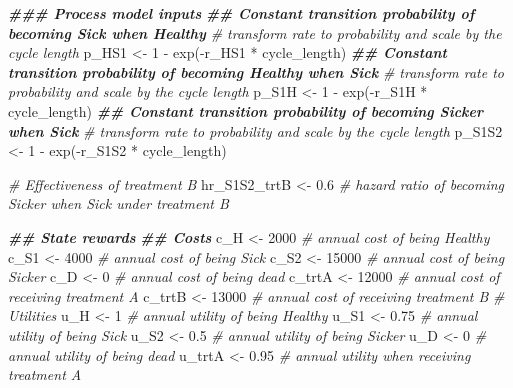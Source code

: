 \documentclass[
]{article}
\newenvironment{Shaded}{\begin{snugshade}}{\end{snugshade}}
\newcommand{\CommentTok}[1]{\textcolor[rgb]{0.56,0.35,0.01}{\textit{#1}}}
\newcommand{\DecValTok}[1]{\textcolor[rgb]{0.00,0.00,0.81}{#1}}
\newcommand{\DocumentationTok}[1]{\textcolor[rgb]{0.56,0.35,0.01}{\textbf{\textit{#1}}}}
\newcommand{\FloatTok}[1]{\textcolor[rgb]{0.00,0.00,0.81}{#1}}
\newcommand{\FunctionTok}[1]{\textcolor[rgb]{0.00,0.00,0.00}{#1}}
\newcommand{\NormalTok}[1]{#1}
\newcommand{\OtherTok}[1]{\textcolor[rgb]{0.56,0.35,0.01}{#1}}
\newcommand{\SpecialCharTok}[1]{\textcolor[rgb]{0.00,0.00,0.00}{#1}}
\begin{document}
\begin{Shaded}
\begin{Highlighting}[]
\DocumentationTok{\#\#\# Process model inputs}
\DocumentationTok{\#\# Constant transition probability of becoming Sick when Healthy}
\CommentTok{\# transform rate to probability and scale by the cycle length}
\NormalTok{p\_HS1 }\OtherTok{\textless{}{-}} \DecValTok{1} \SpecialCharTok{{-}} \FunctionTok{exp}\NormalTok{(}\SpecialCharTok{{-}}\NormalTok{r\_HS1 }\SpecialCharTok{*}\NormalTok{ cycle\_length)}
\DocumentationTok{\#\# Constant transition probability of becoming Healthy when Sick}
\CommentTok{\# transform rate to probability and scale by the cycle length}
\NormalTok{p\_S1H }\OtherTok{\textless{}{-}} \DecValTok{1} \SpecialCharTok{{-}} \FunctionTok{exp}\NormalTok{(}\SpecialCharTok{{-}}\NormalTok{r\_S1H }\SpecialCharTok{*}\NormalTok{ cycle\_length)}
\DocumentationTok{\#\# Constant transition probability of becoming Sicker when Sick}
\CommentTok{\# transform rate to probability and scale by the cycle length}
\NormalTok{p\_S1S2 }\OtherTok{\textless{}{-}} \DecValTok{1} \SpecialCharTok{{-}} \FunctionTok{exp}\NormalTok{(}\SpecialCharTok{{-}}\NormalTok{r\_S1S2 }\SpecialCharTok{*}\NormalTok{ cycle\_length)}

\CommentTok{\# Effectiveness of treatment B}
\NormalTok{hr\_S1S2\_trtB }\OtherTok{\textless{}{-}} \FloatTok{0.6} \CommentTok{\# hazard ratio of becoming Sicker when Sick under treatment B}

\DocumentationTok{\#\# State rewards}
\DocumentationTok{\#\# Costs}
\NormalTok{c\_H    }\OtherTok{\textless{}{-}} \DecValTok{2000}  \CommentTok{\# annual cost of being Healthy}
\NormalTok{c\_S1   }\OtherTok{\textless{}{-}} \DecValTok{4000}  \CommentTok{\# annual cost of being Sick}
\NormalTok{c\_S2   }\OtherTok{\textless{}{-}} \DecValTok{15000} \CommentTok{\# annual cost of being Sicker}
\NormalTok{c\_D    }\OtherTok{\textless{}{-}} \DecValTok{0}     \CommentTok{\# annual cost of being dead}
\NormalTok{c\_trtA }\OtherTok{\textless{}{-}} \DecValTok{12000} \CommentTok{\# annual cost of receiving treatment A}
\NormalTok{c\_trtB }\OtherTok{\textless{}{-}} \DecValTok{13000} \CommentTok{\# annual cost of receiving treatment B}
\CommentTok{\# Utilities}
\NormalTok{u\_H    }\OtherTok{\textless{}{-}} \DecValTok{1}    \CommentTok{\# annual utility of being Healthy}
\NormalTok{u\_S1   }\OtherTok{\textless{}{-}} \FloatTok{0.75} \CommentTok{\# annual utility of being Sick}
\NormalTok{u\_S2   }\OtherTok{\textless{}{-}} \FloatTok{0.5}  \CommentTok{\# annual utility of being Sicker}
\NormalTok{u\_D    }\OtherTok{\textless{}{-}} \DecValTok{0}    \CommentTok{\# annual utility of being dead}
\NormalTok{u\_trtA }\OtherTok{\textless{}{-}} \FloatTok{0.95} \CommentTok{\# annual utility when receiving treatment A}
\end{Highlighting}
\end{Shaded}
\end{document}
